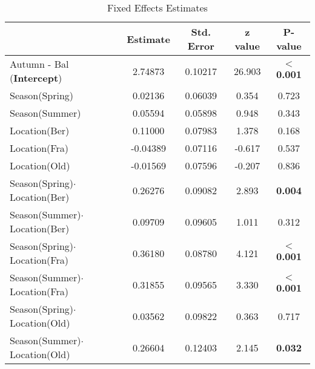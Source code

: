 \documentclass{article}
\begin{document}
\begin{table}[h]
    \centering
    \caption{Fixed Effects Estimates}
    \label{tab:fixed_effects}
    \begin{tabular}{lcccc}
        & Estimate & Std. Error & z value & P-value \\
        \hline
        Autumn - Bal (\textbf{Intercept}) & 2.74873 & 0.10217 & 26.903 & $<$\textbf{0.001} \\
        \hline
        Season(Spring) & 0.02136 & 0.06039 & 0.354 & 0.723 \\
        Season(Summer) & 0.05594 & 0.05898 & 0.948 & 0.343 \\
        \hline
        Location(Ber) & 0.11000 & 0.07983 & 1.378 & 0.168 \\
        Location(Fra) & -0.04389 & 0.07116 & -0.617 & 0.537 \\
        Location(Old) & -0.01569 & 0.07596 & -0.207 & 0.836 \\
        \hline
        Season(Spring)$\cdot$Location(Ber) & 0.26276 & 0.09082 & 2.893 & \textbf{0.004} \\
        Season(Summer)$\cdot$Location(Ber) & 0.09709 & 0.09605 & 1.011 & 0.312 \\
        Season(Spring)$\cdot$Location(Fra) & 0.36180 & 0.08780 & 4.121 & $<$\textbf{0.001} \\
        Season(Summer)$\cdot$Location(Fra) & 0.31855 & 0.09565 & 3.330 & $<$\textbf{0.001} \\
        Season(Spring)$\cdot$Location(Old) & 0.03562 & 0.09822 & 0.363 & 0.717 \\
        Season(Summer)$\cdot$Location(Old) & 0.26604 & 0.12403 & 2.145 & \textbf{0.032} \\
    \end{tabular}
\end{table}
\end{document}
